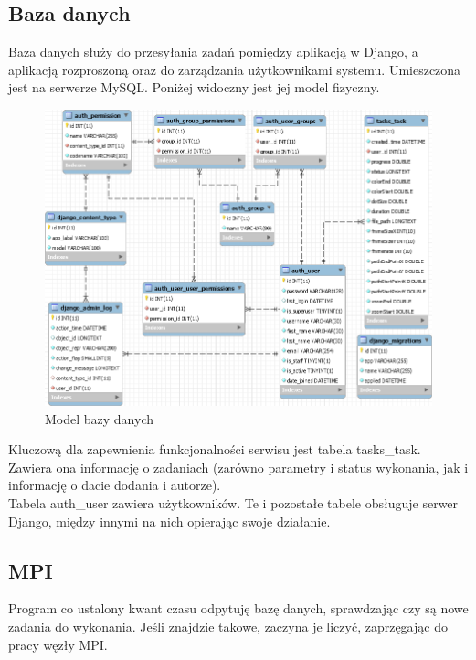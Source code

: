 \documentclass[a4paper]{article}
\begin{document}
\subsection{Baza danych}
Baza danych służy do przesyłania zadań pomiędzy aplikacją w Django, a aplikacją rozproszoną oraz do zarządzania użytkownikami systemu. Umieszczona jest na serwerze MySQL. Poniżej widoczny jest jej model fizyczny.
 \begin{figure}[H]
    \centering
    \includegraphics[width=\textwidth]{sql.png}
    \caption{Model bazy danych}
    \label{fig:db}
\end{figure}

Kluczową dla zapewnienia funkcjonalności serwisu jest tabela tasks\_task. Zawiera ona informację o zadaniach (zarówno parametry i status wykonania, jak i informację o dacie dodania i autorze). \\
Tabela auth\_user zawiera użytkowników. Te i pozostałe tabele obsługuje serwer Django, między innymi na nich opierając swoje działanie.

\subsection{MPI}
Program co ustalony kwant czasu odpytuję bazę danych, sprawdzając czy są nowe zadania do wykonania. Jeśli znajdzie takowe, zaczyna je liczyć, zaprzęgając do pracy węzły MPI.
\end{document}
